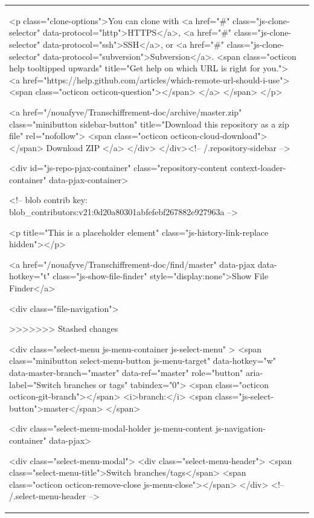 \documentclass[a4paper,11pt,french]{article}
\begin{document}
\begin{tabular}{|m{8cm}|m{8cm}|}
<p class="clone-options">You can clone with
      <a href="#" class="js-clone-selector" data-protocol="http">HTTPS</a>,
      <a href="#" class="js-clone-selector" data-protocol="ssh">SSH</a>,
      or <a href="#" class="js-clone-selector" data-protocol="subversion">Subversion</a>.
  <span class="octicon help tooltipped upwards" title="Get help on which URL is right for you.">
    <a href="https://help.github.com/articles/which-remote-url-should-i-use">
    <span class="octicon octicon-question"></span>
    </a>
  </span>
</p>



              <a href="/nouafyve/Transchiffrement-doc/archive/master.zip"
                 class="minibutton sidebar-button"
                 title="Download this repository as a zip file"
                 rel="nofollow">
                <span class="octicon octicon-cloud-download"></span>
                Download ZIP
              </a>
            </div>
        </div><!-- /.repository-sidebar -->

        <div id="js-repo-pjax-container" class="repository-content context-loader-container" data-pjax-container>
          


<!-- blob contrib key: blob_contributors:v21:0d20a80301abfefebf267882e927963a -->

<p title="This is a placeholder element" class="js-history-link-replace hidden"></p>

<a href="/nouafyve/Transchiffrement-doc/find/master" data-pjax data-hotkey="t" class="js-show-file-finder" style="display:none">Show File Finder</a>

<div class="file-navigation">
  
>>>>>>> Stashed changes

<div class="select-menu js-menu-container js-select-menu" >
  <span class="minibutton select-menu-button js-menu-target" data-hotkey="w"
    data-master-branch="master"
    data-ref="master"
    role="button" aria-label="Switch branches or tags" tabindex="0">
    <span class="octicon octicon-git-branch"></span>
    <i>branch:</i>
    <span class="js-select-button">master</span>
  </span>

  <div class="select-menu-modal-holder js-menu-content js-navigation-container" data-pjax>

    <div class="select-menu-modal">
      <div class="select-menu-header">
        <span class="select-menu-title">Switch branches/tags</span>
        <span class="octicon octicon-remove-close js-menu-close"></span>
      </div> <!-- /.select-menu-header -->


\end{tabular}
\end{document}
